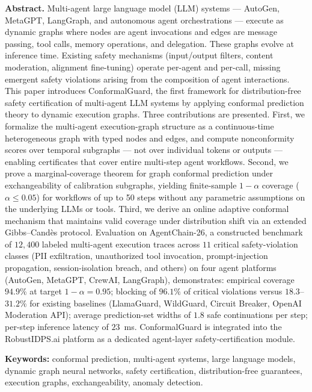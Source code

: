 \documentclass[12pt,a4paper]{article}
\theoremstyle{definition}
\theoremstyle{remark}
\newcommand{\modelname}{ConformalGuard}
\newcommand{\benchname}{AgentChain-26}
\begin{document}
\noindent\textbf{Abstract.} Multi-agent large language model (LLM) systems --- AutoGen, MetaGPT, LangGraph, and autonomous agent orchestrations --- execute as dynamic graphs where nodes are agent invocations and edges are message passing, tool calls, memory operations, and delegation. These graphs evolve at inference time. Existing safety mechanisms (input/output filters, content moderation, alignment fine-tuning) operate per-agent and per-call, missing emergent safety violations arising from the composition of agent interactions. This paper introduces \modelname{}, the first framework for distribution-free safety certification of multi-agent LLM systems by applying conformal prediction theory to dynamic execution graphs. Three contributions are presented. First, we formalize the multi-agent execution-graph structure as a continuous-time heterogeneous graph with typed nodes and edges, and compute nonconformity scores over temporal subgraphs --- not over individual tokens or outputs --- enabling certificates that cover entire multi-step agent workflows. Second, we prove a marginal-coverage theorem for graph conformal prediction under exchangeability of calibration subgraphs, yielding finite-sample $1-\alpha$ coverage ($\alpha \leq 0.05$) for workflows of up to 50 steps without any parametric assumptions on the underlying LLMs or tools. Third, we derive an online adaptive conformal mechanism that maintains valid coverage under distribution shift via an extended Gibbs--Cand\`es protocol. Evaluation on \benchname{}, a constructed benchmark of $12{,}400$ labeled multi-agent execution traces across $11$ critical safety-violation classes (PII exfiltration, unauthorized tool invocation, prompt-injection propagation, session-isolation breach, and others) on four agent platforms (AutoGen, MetaGPT, CrewAI, LangGraph), demonstrates: empirical coverage $94.9\%$ at target $1-\alpha = 0.95$; blocking of $96.1\%$ of critical violations versus $18.3$--$31.2\%$ for existing baselines (LlamaGuard, WildGuard, Circuit Breaker, OpenAI Moderation API); average prediction-set widths of $1.8$ safe continuations per step; per-step inference latency of $23$~ms. \modelname{} is integrated into the RobustIDPS.ai platform as a dedicated agent-layer safety-certification module.

\vspace{0.4em}

\noindent\textbf{Keywords:} conformal prediction, multi-agent systems, large language models, dynamic graph neural networks, safety certification, distribution-free guarantees, execution graphs, exchangeability, anomaly detection.
\end{document}
